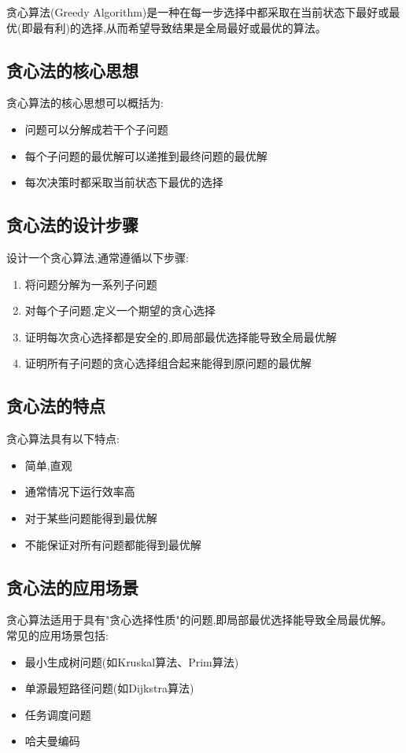 \documentclass[12pt]{article}
\begin{document}
贪心算法(Greedy Algorithm)是一种在每一步选择中都采取在当前状态下最好或最优(即最有利)的选择,从而希望导致结果是全局最好或最优的算法。

\subsection{贪心法的核心思想}

贪心算法的核心思想可以概括为:
\begin{itemize}
    \item 问题可以分解成若干个子问题
    \item 每个子问题的最优解可以递推到最终问题的最优解
    \item 每次决策时都采取当前状态下最优的选择
\end{itemize}

\subsection{贪心法的设计步骤}

设计一个贪心算法,通常遵循以下步骤:

\begin{enumerate}
    \item 将问题分解为一系列子问题
    \item 对每个子问题,定义一个期望的贪心选择
    \item 证明每次贪心选择都是安全的,即局部最优选择能导致全局最优解
    \item 证明所有子问题的贪心选择组合起来能得到原问题的最优解
\end{enumerate}

\subsection{贪心法的特点}

贪心算法具有以下特点:
\begin{itemize}
    \item 简单,直观
    \item 通常情况下运行效率高
    \item 对于某些问题能得到最优解
    \item 不能保证对所有问题都能得到最优解
\end{itemize}

\subsection{贪心法的应用场景}

贪心算法适用于具有"贪心选择性质"的问题,即局部最优选择能导致全局最优解。常见的应用场景包括:
\begin{itemize}
    \item 最小生成树问题(如Kruskal算法、Prim算法)
    \item 单源最短路径问题(如Dijkstra算法)
    \item 任务调度问题
    \item 哈夫曼编码
\end{itemize}
\end{document}
